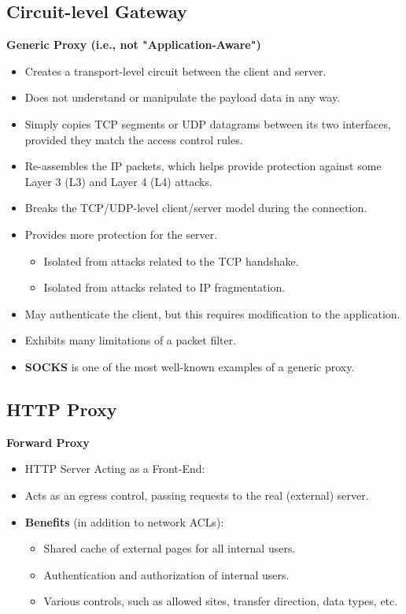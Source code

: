 \subsection{Circuit-level Gateway}
\textbf{Generic Proxy (i.e., not "Application-Aware")}
\begin{itemize}
    \item Creates a transport-level circuit between the client and server.
    \item Does not understand or manipulate the payload data in any way.
    \item Simply copies TCP segments or UDP datagrams between its two interfaces, provided they match the access control rules.
    \item Re-assembles the IP packets, which helps provide protection against some Layer 3 (L3) and Layer 4 (L4) attacks.
    \item Breaks the TCP/UDP-level client/server model during the connection.
    \item Provides more protection for the server.
    \begin{itemize}
        \item Isolated from attacks related to the TCP handshake.
        \item Isolated from attacks related to IP fragmentation.
    \end{itemize} 
    \item May authenticate the client, but this requires modification to the application.
    \item Exhibits many limitations of a packet filter.
    \item \textbf{SOCKS} is one of the most well-known examples of a generic proxy.
\end{itemize}

\subsection{HTTP Proxy}
\begin{center}
    \textbf{Forward Proxy}
\end{center}

\begin{itemize}
\item {HTTP Server Acting as a Front-End:}
\item Acts as an egress control, passing requests to the real (external) server.
\item \textbf{Benefits} (in addition to network ACLs):
\begin{itemize}
    \item Shared cache of external pages for all internal users.
    \item Authentication and authorization of internal users.
    \item Various controls, such as allowed sites, transfer direction, data types, etc.
\end{itemize}
\end{itemize}

